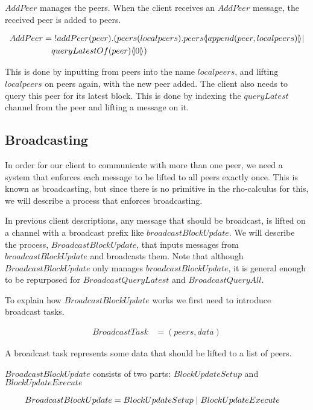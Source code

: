 $AddPeer$ manages the peers.
When the client receives an $AddPeer$ message, the received peer is added to peers.

\begin{align*}
    AddPeer &=\ !addPeer(peer).(peers(localpeers).peers\lift{}{append(peer,localpeers)}|\\
        &\quad queryLatestOf(peer)\lift{}{0})\\
\end{align*}

This is done by inputting from peers into the name $localpeers$, and lifting $localpeers$ on peers again, with the new peer added.
The client also needs to query this peer for its latest block.
This is done by indexing the $queryLatest$ channel from the peer and lifting a message on it.

\subsection{Broadcasting} \label{broadcast}
In order for our client to communicate with more than one peer, we need a system that enforces each message to be lifted to all peers exactly once.
This is known as broadcasting, but since there is no primitive in the rho-calculus for this, we will describe a process that enforces broadcasting.

In previous client descriptions, any message that should be broadcast, is lifted on a channel with a broadcast prefix like $broadcastBlockUpdate$.
We will describe the process, $BroadcastBlockUpdate$, that inputs messages from $broadcastBlockUpdate$ and broadcasts them.
Note that although $BroadcastBlockUpdate$ only manages $broadcastBlockUpdate$, it is general enough to be repurposed for $BroadcastQueryLatest$ and $BroadcastQueryAll$.

To explain how $BroadcastBlockUpdate$ works we first need to introduce broadcast tasks.

\begin{align*}
    BroadcastTask &= (peers, data)
\end{align*}

A broadcast task represents some data that should be lifted to a list of peers.

$BroadcastBlockUpdate$ consists of two parts: $BlockUpdateSetup$ and $BlockUpdateExecute$

\begin{align*}
    BroadcastBlockUpdate &= BlockUpdateSetup \mid BlockUpdateExecute
\end{align*}

